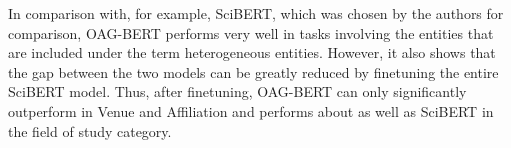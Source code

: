 	In comparison with, for example, SciBERT, which was chosen by the authors for comparison, OAG-BERT performs very well in tasks involving the entities that are included under the term heterogeneous entities. However, it also shows that the gap between the two models can be greatly reduced by finetuning the entire SciBERT model. Thus, after finetuning, OAG-BERT can only significantly outperform in Venue and Affiliation and performs about as well as SciBERT in the field of study category.\cite{Liu2021}

